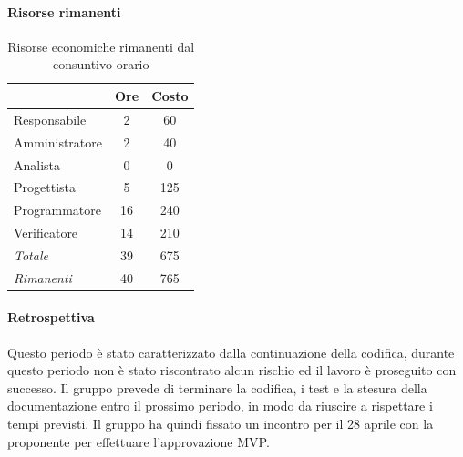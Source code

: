 \documentclass[a4paper,12pt]{article}
\begin{document}
            \paragraph{Risorse rimanenti}
                \begin{table}[H]
                \centering
                \caption{Risorse economiche rimanenti dal consuntivo orario}
                \begin{tabular}{|l|c|c|}
                \hline
                    \rowcolor{lightgray}{\textbf{Ruolo}} & {\textbf{Ore}} & {\textbf{Costo}}\\
                \hline
                    Responsabile & 2 & 60\\
                \hline
                    Amministratore & 2 & 40\\
                \hline
                    Analista & 0 & 0\\
                \hline
                    Progettista & 5 & 125\\
                \hline
                    Programmatore & 16 & 240\\
                \hline
                    Verificatore & 14 & 210\\
                \hline
                    \rowcolor{lightgray}\textit{Totale} & 39 & 675\\
                \hline
                    \rowcolor{lightgray}\textit{Rimanenti} & 40 & 765\\
                \hline
                \end{tabular}
                \end{table}
                
            \paragraph{Retrospettiva}
            Questo periodo è stato caratterizzato dalla continuazione della codifica, durante questo periodo non è stato riscontrato alcun rischio ed il lavoro è proseguito con successo.
            Il gruppo prevede di terminare la codifica, i test e la stesura della documentazione entro il prossimo periodo, in modo da riuscire a rispettare i tempi previsti.
            Il gruppo ha quindi fissato un incontro per il 28 aprile con la proponente per effettuare l'approvazione MVP.
\end{document}
